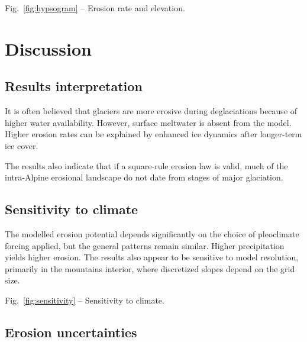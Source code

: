 \documentclass[utf8]{article}
\begin{document}
    Fig.~\ref{fig:hypsogram} -- Erosion rate and elevation.

\section{Discussion}

\subsection{Results interpretation}

    It is often believed that glaciers are more erosive during deglaciations
    because of higher water availability. However, surface meltwater is absent
    from the model. Higher erosion rates can be explained by enhanced ice
    dynamics after longer-term ice cover.

    The results also indicate that if a square-rule erosion law is valid, much
    of the intra-Alpine erosional landscape do not date from stages of major
    glaciation.

\subsection{Sensitivity to climate}

    The modelled erosion potential depends significantly on the choice of
    pleoclimate forcing applied, but the general patterns remain similar.
    Higher precipitation yields higher erosion. The results also appear to be
    sensitive to model resolution, primarily in the mountains interior, where
    discretized slopes depend on the grid size.

    Fig.~\ref{fig:sensitivity} -- Sensitivity to climate.

\subsection{Erosion uncertainties}
\end{document}

